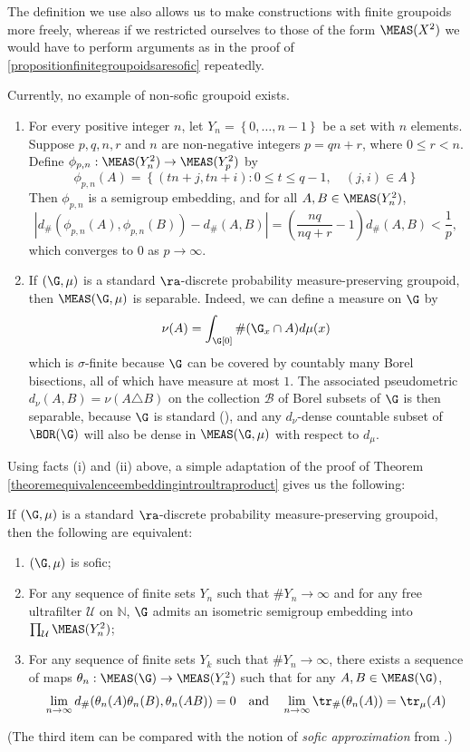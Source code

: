 The definition we use also allows us to make constructions with finite groupoids more freely, whereas if we restricted ourselves to those of the form $\MEAS(X^2)$ we would have to perform arguments as in the proof of \ref{propositionfinitegroupoidsaresofic} repeatedly.

Currently, no example of non-sofic groupoid exists.

\begin{remark}
\begin{enumerate}
\item[(i)] For every positive integer $n$, let $Y_n=\left\{0,\ldots,n-1\right\}$ be a set with $n$ elements. Suppose $p,q,n,r$ and $n$ are non-negative integers $p=qn+r$, where $0\leq r<n$. Define $\phi_{p,n}:\MEAS(Y_n^2)\to\MEAS(Y_p^2)$ by
\[\phi_{p,n}(A)=\left\{(tn+j,tn+i):0\leq t\leq q-1,\quad (j,i)\in A\right\}\]
Then $\phi_{p,n}$ is a semigroup embedding, and for all $A,B\in\MEAS(Y_n^2)$,
\[\left|d_\#(\phi_{p,n}(A),\phi_{p,n}(B))-d_\#(A,B)\right|=\left(\frac{nq}{nq+r}-1\right)d_\#(A,B)<\frac{1}{p},\]
which converges to $0$ as $p\to\infty$.

\item[(ii)] If $(\G,\mu)$ is a standard $\ra$-discrete probability measure-preserving groupoid, then $\MEAS(\G,\mu)$ is separable. Indeed, we can define a measure on $\G$ by
\[\nu(A)=\int_{\G[0]}\#(\G_x\cap A)d\mu(x)\]
which is $\sigma$-finite because $\G$ can be covered by countably many Borel bisections, all of which have measure at most $1$. The associated pseudometric $d_\nu(A,B)=\nu(A\triangle B)$ on the collection $\mathcal{B}$ of Borel subsets of $\G$ is then separable, because $\G$ is standard (\cite[Exercise 17.43]{MR1321597}), and any $d_\nu$-dense countable subset of $\BOR(\G)$ will also be dense in $\MEAS(\G,\mu)$ with respect to $d_\mu$.
\end{enumerate}
\end{remark}

Using facts (i) and (ii) above, a simple adaptation of the proof of Theorem \ref{theoremequivalenceembeddingintroultraproduct} gives us the following:

\begin{proposition}
If $(\G,\mu)$ is a standard $\ra$-discrete probability measure-preserving groupoid, then the following are equivalent:
\begin{enumerate}
\item[(1)] $(\G,\mu)$ is sofic;
\item[(2)] For any sequence of finite sets $Y_n$ such that $\#Y_n\to\infty$ and for any free ultrafilter $\mathcal{U}$ on $\mathbb{N}$, $\G$ admits an isometric semigroup embedding into $\prod_{\mathcal{U}}\MEAS(Y_n^2)$;
\item[(3)] For any sequence of finite sets $Y_k$ such that $\#Y_n\to\infty$, there exists a sequence of maps $\theta_n:\MEAS(\G)\to\MEAS(Y_n^2)$ such that for any $A,B\in\MEAS(\G)$,
\[\lim_{n\to\infty}d_\#(\theta_n(A)\theta_n(B),\theta_n(AB))=0\quad\text{and}\quad\lim_{n\to\infty}\tr_\#(\theta_n(A))=\tr_\mu(A)\]
\end{enumerate}
\end{proposition}
(The third item can be compared with the notion of \emph{sofic approximation} from \cite{MR3286052}.)

